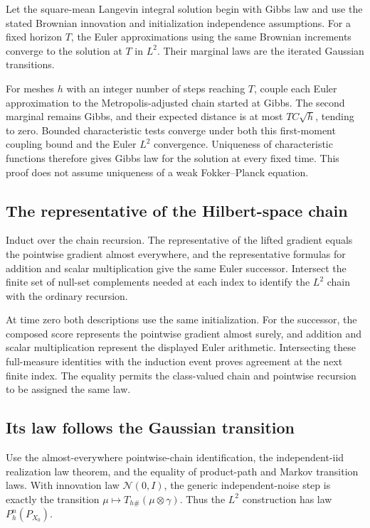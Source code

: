 \documentclass[11pt,a4paper]{article}
\begin{document}
Let the square-mean Langevin integral solution begin with Gibbs law and use the stated Brownian innovation and initialization independence assumptions. For a fixed horizon \(T\), the Euler approximations using the same Brownian increments converge to the solution at \(T\) in \(L^2\). Their marginal laws are the iterated Gaussian transitions.



For meshes \(h\) with an integer number of steps reaching \(T\), couple each Euler approximation to the Metropolis-adjusted chain started at Gibbs. The second marginal remains Gibbs, and their expected distance is at most \(TC\sqrt h\), tending to zero. Bounded characteristic tests converge under both this first-moment coupling bound and the Euler \(L^2\) convergence. Uniqueness of characteristic functions therefore gives Gibbs law for the solution at every fixed time. This proof does not assume uniqueness of a weak Fokker–Planck equation.


\subsection{\texorpdfstring{The representative of the Hilbert-space chain}{The representative of the Hilbert-space chain}}


Induct over the chain recursion. The representative of the lifted gradient equals the pointwise gradient almost everywhere, and the representative formulas for addition and scalar multiplication give the same Euler successor. Intersect the finite set of null-set complements needed at each index to identify the \(L^2\) chain with the ordinary recursion.



At time zero both descriptions use the same initialization. For the successor, the composed score represents the pointwise gradient almost surely, and addition and scalar multiplication represent the displayed Euler arithmetic. Intersecting these full-measure identities with the induction event proves agreement at the next finite index. The equality permits the class-valued chain and pointwise recursion to be assigned the same law.


\subsection{\texorpdfstring{Its law follows the Gaussian transition}{Its law follows the Gaussian transition}}


Use the almost-everywhere pointwise-chain identification, the independent-iid realization law theorem, and the equality of product-path and Markov transition laws. With innovation law \(\mathcal N(0,I)\), the generic independent-noise step is exactly the transition \(\mu\mapsto T_{h\#}(\mu\otimes\gamma)\). Thus the \(L^2\) construction has law \(P_h^n(P_{X_0})\).
\end{document}
